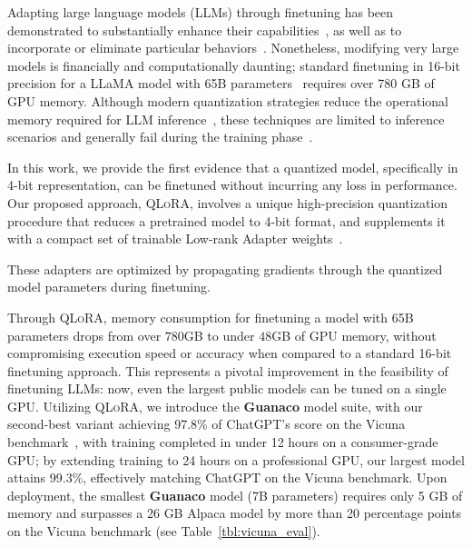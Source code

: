 Adapting large language models (LLMs) through finetuning has been demonstrated to substantially enhance their capabilities~\citep{min2021metaicl, wei2021finetuned, ouyang2022training, wang2022super, wang2022self, liu2022few}, as well as to incorporate or eliminate particular behaviors~\citep{ouyang2022training,askell2021general,bai2022training}. Nonetheless, modifying very large models is financially and computationally daunting; standard finetuning in 16-bit precision for a LLaMA model with 65B parameters~\citep{touvron2023llama} requires over 780 GB of GPU memory. Although modern quantization strategies reduce the operational memory required for LLM inference~\citep{dettmers2022llm, dettmers2022case, frantar2022gptq, xiao2022smoothquant}, these techniques are limited to inference scenarios and generally fail during the training phase~\citep{wortsman2023stable}.

In this work, we provide the first evidence that a quantized model, specifically in 4-bit representation, can be finetuned without incurring any loss in performance. Our proposed approach, \textsc{QLoRA}, involves a unique high-precision quantization procedure that reduces a pretrained model to 4-bit format, and supplements it with a compact set of trainable Low-rank Adapter weights~\citep{hu2021lora}.

These adapters are optimized by propagating gradients through the quantized model parameters during finetuning.

Through \textsc{QLoRA}, memory consumption for finetuning a model with 65B parameters drops from over $780$GB to under $48$GB of GPU memory, without compromising execution speed or accuracy when compared to a standard 16-bit finetuning approach. This represents a pivotal improvement in the feasibility of finetuning LLMs: now, even the largest public models can be tuned on a single GPU. Utilizing \textsc{QLoRA}, we introduce the \textbf{Guanaco} model suite, with our second-best variant achieving 97.8\% of ChatGPT’s score on the Vicuna benchmark~\citep{vicuna2023}, with training completed in under 12 hours on a consumer-grade GPU; by extending training to 24 hours on a professional GPU, our largest model attains 99.3\%, effectively matching ChatGPT on the Vicuna benchmark. Upon deployment, the smallest \textbf{Guanaco} model (7B parameters) requires only 5 GB of memory and surpasses a 26 GB Alpaca model by more than 20 percentage points on the Vicuna benchmark (see Table~\ref{tbl:vicuna_eval}).


